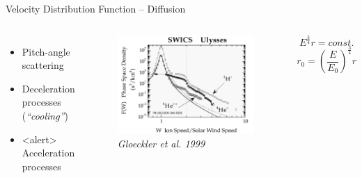 \documentclass{beamer}
\begin{document}
\begin{frame}{Velocity Distribution Function -- Diffusion} %
\begin{columns}
	\column{5cm}
		\begin{itemize}
			\item Pitch-angle scattering 
			\vspace{1cm}
			\item Deceleration processes (\textit{``cooling''})
			\vspace{1cm}
			\item<alert> Acceleration processes
		\end{itemize}
	\column{7.5cm}
		\begin{figure}
			\includegraphics[scale=0.2]{pictures/sw_pui_gloeckler.png}
			\caption{\tiny{\textit{Gloeckler et al. 1999}}}
		\end{figure}
		\[E^{\frac{3}{4}}r = const.\]
		\[r_0=\left({\frac{E}{E_{0}}}\right)^{\frac{3}{4}}r\]
\end{columns}
\end{frame}
\end{document}
